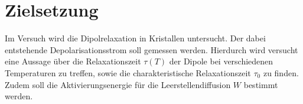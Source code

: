 \section{Zielsetzung}
\label{sec:Zielsetzung}
Im Versuch wird die Dipolrelaxation in Kristallen untersucht.
Der dabei entstehende Depolarisationsstrom soll gemessen werden.
Hierdurch wird versucht eine Aussage über die Relaxationszeit $\tau(T)$ der Dipole bei verschiedenen Temperaturen zu treffen,
sowie die charakteristische Relaxationszeit $\tau_0$ zu finden.
Zudem soll die Aktivierungsenergie für die Leerstellendiffusion $W$ bestimmt werden.